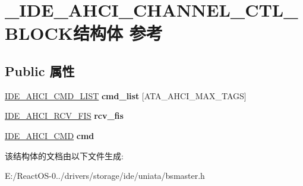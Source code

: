 \hypertarget{struct___i_d_e___a_h_c_i___c_h_a_n_n_e_l___c_t_l___b_l_o_c_k}{}\section{\+\_\+\+I\+D\+E\+\_\+\+A\+H\+C\+I\+\_\+\+C\+H\+A\+N\+N\+E\+L\+\_\+\+C\+T\+L\+\_\+\+B\+L\+O\+C\+K结构体 参考}
\label{struct___i_d_e___a_h_c_i___c_h_a_n_n_e_l___c_t_l___b_l_o_c_k}
\subsection*{Public 属性}
\begin{DoxyCompactItemize}
\item 
\mbox{\label{struct___i_d_e___a_h_c_i___c_h_a_n_n_e_l___c_t_l___b_l_o_c_k_a014e5a52166998ee053ebcedc575c1d5}} 
\hyperlink{struct___i_d_e___a_h_c_i___c_m_d___l_i_s_t}{I\+D\+E\+\_\+\+A\+H\+C\+I\+\_\+\+C\+M\+D\+\_\+\+L\+I\+ST} {\bfseries cmd\+\_\+list} \mbox{[}A\+T\+A\+\_\+\+A\+H\+C\+I\+\_\+\+M\+A\+X\+\_\+\+T\+A\+GS\mbox{]}
\item 
\mbox{\label{struct___i_d_e___a_h_c_i___c_h_a_n_n_e_l___c_t_l___b_l_o_c_k_a8a8fdcd9e53723f8d0af181f8872daa2}} 
\hyperlink{struct___i_d_e___a_h_c_i___r_c_v___f_i_s}{I\+D\+E\+\_\+\+A\+H\+C\+I\+\_\+\+R\+C\+V\+\_\+\+F\+IS} {\bfseries rcv\+\_\+fis}
\item 
\mbox{\label{struct___i_d_e___a_h_c_i___c_h_a_n_n_e_l___c_t_l___b_l_o_c_k_aa968ea28d5c0616675025ff793d9c5c1}} 
\hyperlink{struct___i_d_e___a_h_c_i___c_m_d}{I\+D\+E\+\_\+\+A\+H\+C\+I\+\_\+\+C\+MD} {\bfseries cmd}
\end{DoxyCompactItemize}


该结构体的文档由以下文件生成\+:\begin{DoxyCompactItemize}
\item 
E\+:/\+React\+O\+S-\/0../drivers/storage/ide/uniata/bsmaster.\+h\end{DoxyCompactItemize}
